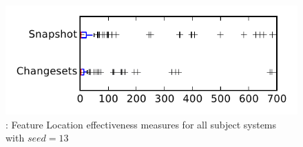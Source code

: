 
\begin{figure}
\centering
\includegraphics[height=0.4\textheight]{figures/flt_seed/rq1_tiny_13}
\caption{\rone: Feature Location effectiveness measures for all subject systems with $seed=13$}
\label{fig:flt_seed:rq1:tiny}
\end{figure}
